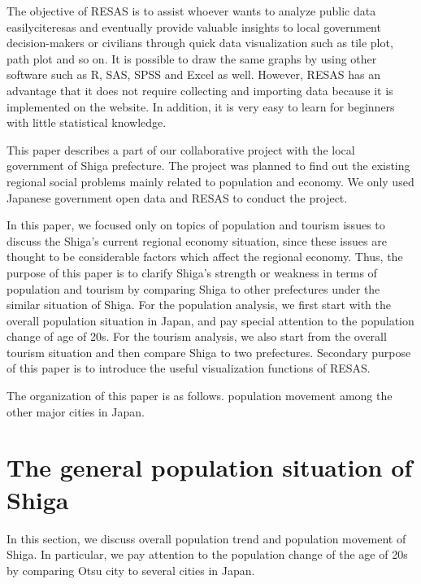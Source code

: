 \documentclass[10pt, conference, compsocconf]{IEEEtran}
\begin{document}
The objective of RESAS is to assist whoever wants to analyze public data easilycite{resas} and eventually provide valuable insights to local government decision-makers or civilians through quick data visualization such as tile plot, path plot and so on. 
It is possible to draw the same graphs by using other software such as R, SAS, SPSS and Excel as well. However, RESAS has an advantage that it does not require collecting and importing data because it is implemented on the website. In addition, it is very easy to learn for beginners with little statistical knowledge. 

This paper describes a part of our collaborative project with the local government of Shiga prefecture. 
The project was planned to find out the existing regional social problems mainly related to population and economy. We only used Japanese government open data and RESAS to conduct the project.

In this paper, we focused only on topics of population and tourism issues to discuss the Shiga's current regional economy situation, since these issues are thought to be considerable factors 
which affect the regional economy.
Thus, the purpose of this paper is to clarify Shiga's strength or weakness in terms of  population and tourism by comparing Shiga to other prefectures under the similar situation of Shiga.
For the population analysis, we first start with the overall population situation in Japan, and pay special attention to the population change of age of 20s.
For the tourism analysis, we also start from the overall tourism situation and then compare Shiga to two prefectures.
Secondary purpose of this paper is to introduce the useful 
visualization functions of RESAS.



The organization of this paper is as follows. 
population movement
among the other major cities in Japan.


\section{The general population situation of Shiga}\label{sec:pop}
In this section, we discuss overall population trend and population movement of Shiga. 
In particular, we pay attention to the population change of the age of 20s by comparing Otsu city to several cities in Japan.
\end{document}
